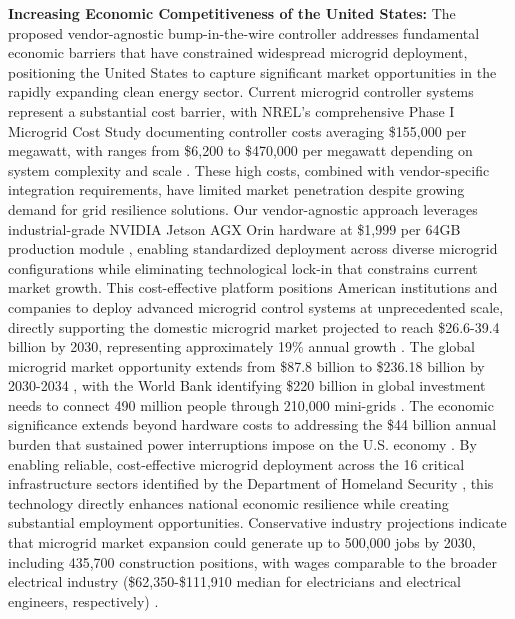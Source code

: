 \documentclass[12pt]{article}
\begin{document}
\textbf{Increasing Economic Competitiveness of the United States:} The proposed vendor-agnostic bump-in-the-wire controller addresses fundamental economic barriers that have constrained widespread microgrid deployment, positioning the United States to capture significant market opportunities in the rapidly expanding clean energy sector. Current microgrid controller systems represent a substantial cost barrier, with NREL's comprehensive Phase I Microgrid Cost Study documenting controller costs averaging \$155,000 per megawatt, with ranges from \$6,200 to \$470,000 per megawatt depending on system complexity and scale \cite{giraldez2018}. These high costs, combined with vendor-specific integration requirements, have limited market penetration despite growing demand for grid resilience solutions.
Our vendor-agnostic approach leverages industrial-grade NVIDIA Jetson AGX Orin hardware at \$1,999 per 64GB production module \cite{nvidia2022jetson}, enabling standardized deployment across diverse microgrid configurations while eliminating technological lock-in that constrains current market growth. This cost-effective platform positions American institutions and companies to deploy advanced microgrid control systems at unprecedented scale, directly supporting the domestic microgrid market projected to reach \$26.6-39.4 billion by 2030, representing approximately 19\% annual growth \cite{marketdigits2024microgrid,grandview2024us}. The global microgrid market opportunity extends from \$87.8 billion to \$236.18 billion by 2030-2034 \cite{marketsandmarkets2024microgrid,precedence2024microgrid}, with the World Bank identifying \$220 billion in global investment needs to connect 490 million people through 210,000 mini-grids \cite{worldbank2019minigrids}.
The economic significance extends beyond hardware costs to addressing the \$44 billion annual burden that sustained power interruptions impose on the U.S. economy \cite{lacommare2018interruption}. By enabling reliable, cost-effective microgrid deployment across the 16 critical infrastructure sectors identified by the Department of Homeland Security \cite{cisa2024sectors}, this technology directly enhances national economic resilience while creating substantial employment opportunities. Conservative industry projections indicate that microgrid market expansion could generate up to 500,000 jobs by 2030, including 435,700 construction positions, with wages comparable to the broader electrical industry (\$62,350-\$111,910 median for electricians and electrical engineers, respectively) \cite{guidehouse2021microgrids,bls2024wages}.
\end{document}
